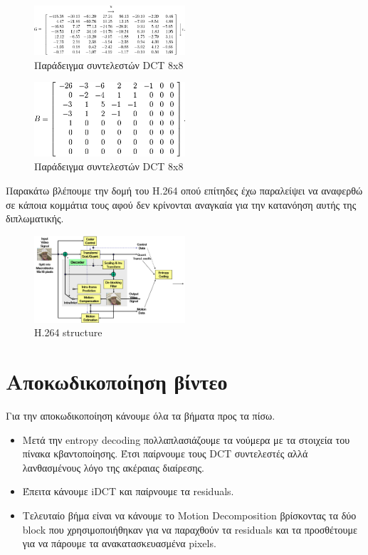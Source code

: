 \begin{figure}[h!]
    \centering
    \includegraphics[width=0.5\textwidth]{chapter2/coeff.png}
    \caption{Παράδειγμα συντελεστών DCT 8x8}
    \label{fig:coeff}
\end{figure}

\begin{figure}[h!]
    \centering
    \includegraphics[width=0.5\textwidth]{chapter2/results.png}
    \caption{Παράδειγμα συντελεστών DCT 8x8}
    \label{fig:results}
\end{figure}

\indent Παρακάτω βλέπουμε την δομή του H.264 οπού επίτηδες έχω παραλείψει να αναφερθώ σε κάποια κομμάτια τους αφού δεν κρίνονται αναγκαία για την κατανόηση αυτής της διπλωματικής.

\begin{figure}[h]
    \centering
    \includegraphics[width=0.5\textwidth]{chapter2/h264.png}
    \caption{H.264 structure}
    \label{fig:h264}
\end{figure}

\newpage

\section{Αποκωδικοποίηση βίντεο}
\label{section:sect26}

\indent Για την αποκωδικοποίηση κάνουμε όλα τα βήματα προς τα πίσω.

\begin{itemize}
  \item Μετά την entropy decoding πολλαπλασιάζουμε τα νούμερα με τα στοιχεία του πίνακα κβαντοποίησης. Έτσι παίρνουμε τους DCT συντελεστές αλλά λανθασμένους λόγο της ακέραιας διαίρεσης.
  \item Έπειτα κάνουμε iDCT και παίρνουμε τα residuals.
  \item Τελευταίο βήμα είναι να κάνουμε το Motion Decomposition βρίσκοντας τα δύο block που χρησιμοποιήθηκαν για να παραχθούν τα residuals και τα προσθέτουμε για να πάρουμε τα ανακατασκευασμένα pixels.
\end{itemize} 